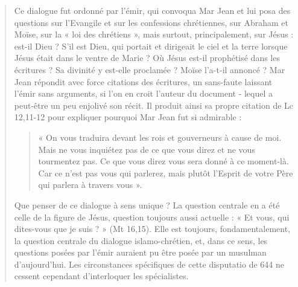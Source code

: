 \begin{quote}
Ce dialogue fut ordonné par l’émir, qui convoqua Mar Jean et lui posa des questions sur l’Evangile et sur les confessions chrétiennes, sur Abraham et Moïse, sur la « loi des chrétiens », mais surtout, principalement, sur Jésus : est-il Dieu ? S’il est Dieu, qui portait et dirigeait le ciel et la terre lorsque Jésus était dans le ventre de Marie ? Où Jésus est-il prophétisé dans les écritures ? Sa divinité y est-elle proclamée ? Moïse l’a-t-il annoncé ? Mar Jean répondit avec force citations des écritures, un sans-faute laissant l’émir sans arguments, si l’on en croit l’auteur du document - lequel a peut-être un peu enjolivé son récit. Il produit ainsi sa propre citation de Lc 12,11-12 pour expliquer pourquoi Mar Jean fut si admirable : 
\begin{quote}
   « On vous traduira devant les rois et gouverneurs à cause de moi. Mais ne vous inquiétez pas de ce que vous direz et ne vous tourmentez pas. Ce que vous direz vous sera donné à ce moment-là. Car ce n’est pas vous qui parlerez, mais plutôt l’Esprit de votre Père qui parlera à travers vous ». 
\end{quote}
Que penser de ce dialogue à sens unique ? La question centrale en a été celle de la figure de Jésus, question toujours aussi actuelle : « Et vous, qui dites-vous que je suis ? » (Mt 16,15). Elle est toujours, fondamentalement, la question centrale du dialogue islamo-chrétien, et, dans ce sens, les questions posées par l’émir auraient pu être posée par un musulman d’aujourd’hui.
Les circonstances spécifiques de cette disputatio de 644 ne cessent cependant d’interloquer les spécialistes. 

\end{quote}
